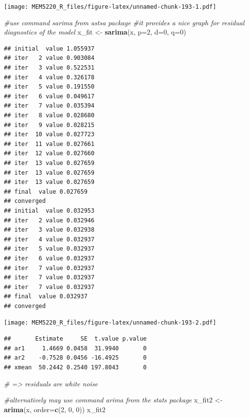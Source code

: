 \documentclass[]{book}
\newenvironment{Shaded}{\begin{snugshade}}{\end{snugshade}}
\newcommand{\CommentTok}[1]{\textcolor[rgb]{0.56,0.35,0.01}{\textit{#1}}}
\newcommand{\DataTypeTok}[1]{\textcolor[rgb]{0.13,0.29,0.53}{#1}}
\newcommand{\DecValTok}[1]{\textcolor[rgb]{0.00,0.00,0.81}{#1}}
\newcommand{\KeywordTok}[1]{\textcolor[rgb]{0.13,0.29,0.53}{\textbf{#1}}}
\newcommand{\NormalTok}[1]{#1}
\newcommand{\OperatorTok}[1]{\textcolor[rgb]{0.81,0.36,0.00}{\textbf{#1}}}
\newcommand{\StringTok}[1]{\textcolor[rgb]{0.31,0.60,0.02}{#1}}
\begin{document}
\texttt{[image: MEM5220\_R\_files/figure-latex/unnamed-chunk-193-1.pdf]}

\begin{Shaded}
\begin{Highlighting}[]
\CommentTok{#use command sarima from astsa package}
\CommentTok{#it provides a nice graph for residual diagnostics of the model}
\NormalTok{x_fit <-}\StringTok{ }\KeywordTok{sarima}\NormalTok{(x, }\DataTypeTok{p=}\DecValTok{2}\NormalTok{, }\DataTypeTok{d=}\DecValTok{0}\NormalTok{, }\DataTypeTok{q=}\DecValTok{0}\NormalTok{)}
\end{Highlighting}
\end{Shaded}

\begin{verbatim}
## initial  value 1.055937 
## iter   2 value 0.903084
## iter   3 value 0.522531
## iter   4 value 0.326178
## iter   5 value 0.191550
## iter   6 value 0.049617
## iter   7 value 0.035394
## iter   8 value 0.028680
## iter   9 value 0.028215
## iter  10 value 0.027723
## iter  11 value 0.027661
## iter  12 value 0.027660
## iter  13 value 0.027659
## iter  13 value 0.027659
## iter  13 value 0.027659
## final  value 0.027659 
## converged
## initial  value 0.032953 
## iter   2 value 0.032946
## iter   3 value 0.032938
## iter   4 value 0.032937
## iter   5 value 0.032937
## iter   6 value 0.032937
## iter   7 value 0.032937
## iter   7 value 0.032937
## iter   7 value 0.032937
## final  value 0.032937 
## converged
\end{verbatim}

\texttt{[image: MEM5220\_R\_files/figure-latex/unnamed-chunk-193-2.pdf]}

\begin{Shaded}
\end{Shaded}

\begin{verbatim}
##       Estimate     SE  t.value p.value
## ar1     1.4669 0.0458  31.9940       0
## ar2    -0.7528 0.0456 -16.4925       0
## xmean  50.2442 0.2540 197.8043       0
\end{verbatim}

\begin{Shaded}
\begin{Highlighting}[]
\CommentTok{# => residuals are white noise}

\CommentTok{#alternatively may use command arima from the stats package}
\NormalTok{x_fit2 <-}\StringTok{ }\KeywordTok{arima}\NormalTok{(x, }\DataTypeTok{order=}\KeywordTok{c}\NormalTok{(}\DecValTok{2}\NormalTok{, }\DecValTok{0}\NormalTok{, }\DecValTok{0}\NormalTok{))}
\NormalTok{x_fit2}
\end{Highlighting}
\end{Shaded}
\end{document}
